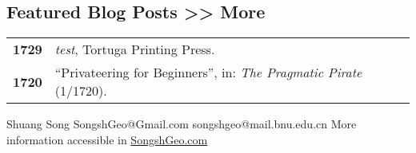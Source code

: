 \documentclass[lighthipster]{simplehipstercv}
\newlength{\rightcolwidth}
\begin{document}
\begin{paracol}{2}
\section*{Featured Blog Posts \hfill\footnotesize\textbf{>> More}}
\begin{tabular}{>{\footnotesize\bfseries}r >{\footnotesize}p{}}
    1729 & \emph{test}, Tortuga Printing Press. \\
    1720 & ``Privateering for Beginners'', in: \emph{The Pragmatic Pirate} (1/1720).
\end{tabular}
\bigskip



\vfill{} %

\setlength{\parindent}{0pt}
\begin{minipage}[t]{\rightcolwidth}
\begin{center}\fontfamily{\sfdefault}\selectfont \color{black!70}
{\small Shuang Song  SongshGeo@Gmail.com  songshgeo@mail.bnu.edu.cn \newline{} More information accessible in \href{www.songshgeo.com}{SongshGeo.com}
}
\end{center}
\end{minipage}

\end{paracol}
\end{document}
